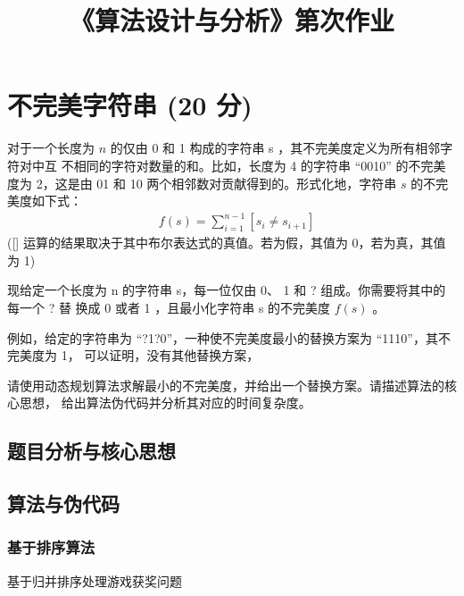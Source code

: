 \documentclass{article}
\title{\heiti \myCollege《算法设计与分析》第\myHomeworkId 次作业} %
\author{\myCollege \quad \myId \quad \myName} %
\begin{document}
\maketitle

\section{不完美字符串 (20 分)}

对于一个长度为 $n$ 的仅由 0 和 1 构成的字符串 s ，其不完美度定义为所有相邻字符对中互
不相同的字符对数量的和。比如，长度为 4 的字符串 “0010” 的不完美度为 2，这是由 01 和 10 两个相邻数对贡献得到的。形式化地，字符串 $s$ 的不完美度如下式：
\begin{align*}
    & f(s) =  \sum_{i=1}^{n-1} [s_i \ne s_{i+1}]
\end{align*}
([] 运算的结果取决于其中布尔表达式的真值。若为假，其值为 0，若为真，其值为 1)

现给定一个长度为 n 的字符串 s，每一位仅由 0、 1 和 ? 组成。你需要将其中的每一个 ? 替
换成 0 或者 1 ，且最小化字符串 s 的不完美度 $f(s)$ 。

例如，给定的字符串为 “?1?0”，一种使不完美度最小的替换方案为 “1110”，其不完美度为 1，
可以证明，没有其他替换方案，

请使用动态规划算法求解最小的不完美度，并给出一个替换方案。请描述算法的核心思想，
给出算法伪代码并分析其对应的时间复杂度。

\subsection{题目分析与核心思想}

\subsection{算法与伪代码}

\subsubsection{基于排序算法}
\begin{algorithm}[H]

\caption{基于归并排序处理游戏获奖问题}
\LinesNumbered
{}

\end{algorithm}
\end{document}
